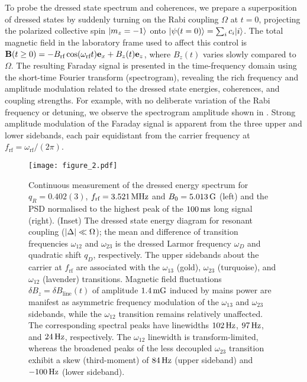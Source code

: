 \documentclass[aps,prl,reprint,superscriptaddress,floatfix]{revtex4-1}
\begin{document}
To probe the dressed state spectrum and coherences, we prepare a superposition of dressed states by suddenly turning on the Rabi coupling $\Omega$ at $t=0$, projecting the polarized collective spin $\vert m_z=-1 \rangle $ onto $\vert \psi(t=0) \rangle  = \sum_i c_i \vert i \rangle $.
The total magnetic field in the laboratory frame used to affect this control is $\mathbf{B}(t \geq 0) = -B_{\text{rf}} \cos (\omega_{\text{rf}} t) \mathbf{e}_x + B_z(t) \mathbf{e}_z$, where $B_z(t)$ varies slowly compared to $\Omega$.
The resulting Faraday signal is presented in the time-frequency domain using the short-time Fourier transform (spectrogram), revealing the rich frequency and amplitude modulation related to the dressed state energies, coherences, and coupling strengths.
For example, with no deliberate variation of the Rabi frequency or detuning, we observe the spectrogram amplitude shown in .
Strong amplitude modulation of the Faraday signal is apparent from the three upper and lower sidebands, each pair equidistant from the carrier frequency at $f_{\text{rf}} = \omega_{\text{rf}}/(2\pi)$. 
\begin{figure}
    \texttt{[image: figure\_2.pdf]}
    \caption{
    \label{fig:static_coupling}
    Continuous measurement of the dressed energy spectrum for $q_R = 0.402(3)$, $f_{\text{rf}}=\unit[3.521]{MHz}$ and $B_0=\unit[5.013]{G}$ (left) and the PSD normalised to the highest peak of the $\unit[100]{ms}$ long signal (right). 
    (Inset) The dressed state energy diagram for resonant coupling ($\vert \Delta \vert  \ll \Omega$); the mean and difference of transition frequencies $\omega_{12}$ and $\omega_{23}$ is the dressed Larmor frequency $\omega_D$ and quadratic shift $q_D$, respectively.
    The upper sidebands about the carrier at $f_{\text{rf}}$ are associated with the $\omega_{13}$ (gold), $\omega_{23}$ (turquoise), and $\omega_{12}$ (lavender) transitions.  
    Magnetic field fluctuations $\delta B_z = \delta B_{\text{line}}(t)$ of amplitude $\unit[1.4]{mG}$ induced by mains power are manifest as asymmetric frequency modulation of the $\omega_{13}$ and $\omega_{23}$ sidebands, while the $\omega_{12}$ transition remains relatively unaffected.
    The corresponding spectral peaks have linewidths $\unit[102]{Hz}$, $\unit[97]{Hz}$, and $\unit[24]{Hz}$, respectively.
    The $\omega_{12}$ linewidth is transform-limited, whereas the broadened peaks of the less decoupled $\omega_{23}$ transition exhibit a skew (third-moment) of $\unit[84]{Hz}$ (upper sideband) and $-\unit[100]{Hz}$ (lower sideband).
    }
\end{figure}
\end{document}
